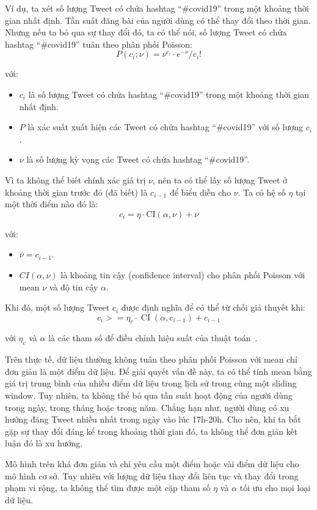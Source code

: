 Ví dụ, ta xét số lượng Tweet có chứa hashtag ``\#covid19'' trong một khoảng thời gian nhất định. Tần suất đăng bài của người dùng có thể thay đổi theo thời gian. Nhưng nếu ta bỏ qua sự thay đổi đó, ta có thể nói, số lượng Tweet có chứa hashtag ``\#covid19'' tuân theo phân phối Poisson:
\[ P\left(c_{i} ; \nu\right)=\nu^{c_{i}} \cdot e^{-\nu} / c_{i} ! \]

với:
\begin{itemize}
	\item $c_{i}$ là số lượng Tweet có chứa hashtag ``\#covid19'' trong một khoảng thời gian nhất định.
	\item $P$ là xác suất xuất hiện các Tweet có chứa hashtag ``\#covid19'' với số lượng $c_{i}$.
	\item $\nu$ là số lượng kỳ vọng các Tweet có chứa hashtag ``\#covid19''.
\end{itemize}

Vì ta không thể biết chính xác giá trị $\nu$, nên ta có thể lấy số lượng Tweet ở khoảng thời gian trước đó (đã biết) là $c_{i - 1}$ để biểu diễn cho $\nu$. Ta có hệ số $\eta$ tại một thời điểm nào đó là:
\[ c_{i}=\eta \cdot \mathrm{CI}(\alpha, \nu)+\nu \]

với:
\begin{itemize}
	\item $\nu=c_{i-1}$.
	\item $CI(\alpha, \nu)$ là khoảng tin cậy (confidence interval) cho phân phối Poisson với mean $\nu$ và độ tin cậy $\alpha$.
\end{itemize}

Khi đó, một số lượng Tweet $c_{i}$ được định nghĩa để có thể từ chối giả thuyết khi:
\[
	c_{i}>=\eta_{c} \cdot \operatorname{CI}\left(\alpha, c_{i-1}\right)+c_{i-1}
\]

với $\eta_{c}$ và $\alpha$ là các tham số để điều chỉnh hiệu suất của thuật toán~\cite{hendricksonTrendDetectionSocial2015}.

Trên thực tế, dữ liệu thường không tuân theo phân phối Poisson với mean chỉ đơn giản là một điểm dữ liệu. Để giải quyết vấn đề này, ta có thể tính mean bằng giá trị trung bình của nhiều điểm dữ liệu trong lịch sử trong cùng một sliding window. Tuy nhiên, ta không thể bỏ qua tần suất hoạt động của người dùng trong ngày, trong tháng hoặc trong năm. Chẳng hạn như, người dùng có xu hướng đăng Tweet nhiều nhất trong ngày vào lúc 17h-20h. Cho nên, khi ta bắt gặp sự thay đổi đáng kể trong khoảng thời gian đó, ta không thể đơn giản kết luận đó là xu hướng.

Mô hình trên khá đơn giản và chỉ yêu cầu một điểm hoặc vài điểm dữ liệu cho mô hình cơ sở. Tuy nhiên với lượng dữ liệu thay đổi liên tục và thay đổi trong phạm vi rộng, ta không thể tìm được một cặp tham số $\eta$ và $\alpha$ tối ưu cho mọi loại dữ liệu.

